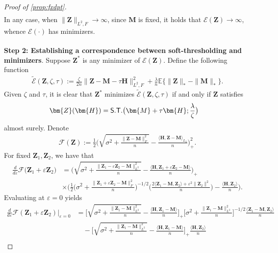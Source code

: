 \documentclass[10pt]{article}
\newcommand{\eps}{\ensuremath{\varepsilon}}
\newcommand{\s}{^*}
\renewcommand{\tilde}{\widetilde}
\theoremstyle{definition}
\begin{document}
\begin{proof}[Proof of \cref{prop:fxdpt}]
\begin{align}
\end{align}
In any case, when $\|\bm{Z}\|_{L^2,F} \to \infty$, since $\bm{M}$ is fixed, it holds that $\mathcal{E}(\bm{Z}) \to \infty$, whence $\mathcal{E}(\cdot)$ has minimizers.  
\\ \ \\
\noindent
\textbf{Step 2: Establishing a correspondence between soft-thresholding and minimizers}.  Suppose $\bm{Z}\s$ is any minimizer of $\mathcal{E}(\bm{Z})$.   Define the following function
 \begin{align}
     \mathcal{\tilde E}(\bm{Z},\zeta,\tau) := \frac{\zeta}{2 n} \| \bm{Z} - \bm{M} - \tau \bm{H} \|_{L^2,F}^2 + \frac{\lambda}{n} \mathbb{E} \big\{ \| \bm{Z} \|_* - \| \bm{M} \|_* \big\}.
 \end{align}
Given $\zeta$ and $\tau$, it is clear that $\bm{Z}\s$ minimizes $\mathcal{\tilde E}(\bm{Z},\zeta,\tau)$ if and only if $\bm{Z}$ satisfies
\begin{align}
    \bm{Z}(\bm{H}) &= {\sf S.T.} \big( \bm{M} + \tau \bm{H} ; \frac{\lambda}{\zeta} \big)
\end{align}
almost surely. Denote
\begin{align}
    \mathcal{F}(\bm{Z}) := \frac{1}{2} \bigg( \sqrt{\sigma^2  + \frac{\|\bm{Z - M}\|_F^2}{n}} - \frac{\langle \bm{H}, \bm{Z - M} \rangle_{L_2}}{n} \bigg)^2_+.
\end{align}
For fixed $\bm{Z}_1, \bm{Z}_2$, we have that
\begin{align}
    \frac{d}{d\eps} \mathcal{F}\big(\bm{Z}_1 + \eps \bm{Z}_2 \big)  &=  \bigg( \sqrt{\sigma^2 + \frac{\| \bm{Z}_1 -\eps \bm{Z}_2 - \bm{M} \|_{L^2}^2}{n}} - \frac{\langle \bm{H}, \bm{Z}_1 + \eps \bm{Z}_2 - \bm{M} \rangle }{n}\bigg)_{+} \\
    &\times \bigg( \frac{1}{2} \big( \sigma^2 + \frac{\|\bm{Z}_1 + \eps \bm{Z}_2 - \bm{M} \|_F^2}{n} \big)^{-1/2} \bigg( \frac{2\langle \bm{Z}_1 - \bm{M}, \bm{Z}_2 \rangle + \eps^2 \| \bm{Z}_2 \|^2 }{n} \bigg) -  \frac{\langle \bm{H}, \bm{Z}_2 \rangle }{n} \bigg).
\end{align}
Evaluating at $\eps= 0$ yields
\begin{align}
    \frac{d}{d\eps} \mathcal{F}(\bm{Z}_1 + \eps \bm{Z}_2 ) \bigg|_{\eps = 0} &=  \bigg[ \sqrt{\sigma^2 + \frac{\|\bm{Z}_1 - \bm{M} \|_{L^2}^2}{n}} - \frac{\langle \bm{H}, \bm{Z}_1 - \bm{M} \rangle }{n} \bigg]_+ \bigg[\sigma^2 + \frac{\|\bm{Z}_1 - \bm{M} \|_{L^2}^2}{n} \bigg]^{-1/2} \frac{\langle \bm{Z}_1 - \bm{M}, \bm{Z}_2 \rangle}{n} \\
    &\quad -  \bigg[\sqrt{\sigma^2 + \frac{\|\bm{Z}_1 - \bm{M} \|_{L^2}^2}{n}} - \frac{\langle \bm{H}, \bm{Z}_1 - \bm{M} \rangle }{n} \bigg]_+ \frac{\langle \bm{H}, \bm{Z}_2 \rangle}{n} \\

\end{align}
\end{proof}
\end{document}
